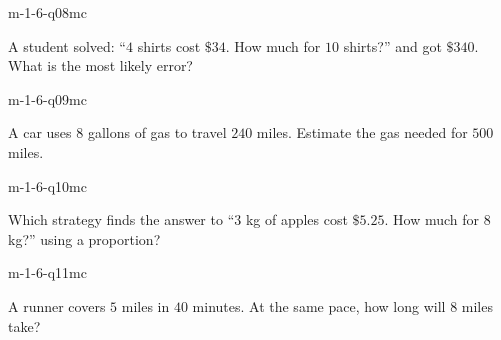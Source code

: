 \begin{practiceQuestion}{m-1-6-q08}{mc}
\begin{questionText}
A student solved: ``$4$ shirts cost $\$34$. How much for $10$ shirts?'' and got $\$340$. What is the most likely error?
\end{questionText}
\end{practiceQuestion}

\begin{practiceQuestion}{m-1-6-q09}{mc}
\begin{questionText}
A car uses $8$ gallons of gas to travel $240$ miles. Estimate the gas needed for $500$ miles.
\end{questionText}
\end{practiceQuestion}

\begin{practiceQuestion}{m-1-6-q10}{mc}
\begin{questionText}
Which strategy finds the answer to ``$3$ kg of apples cost $\$5.25$. How much for $8$ kg?'' using a proportion?
\end{questionText}
\end{practiceQuestion}

\begin{practiceQuestion}{m-1-6-q11}{mc}
\begin{questionText}
A runner covers $5$ miles in $40$ minutes. At the same pace, how long will $8$ miles take?
\end{questionText}
\end{practiceQuestion}

